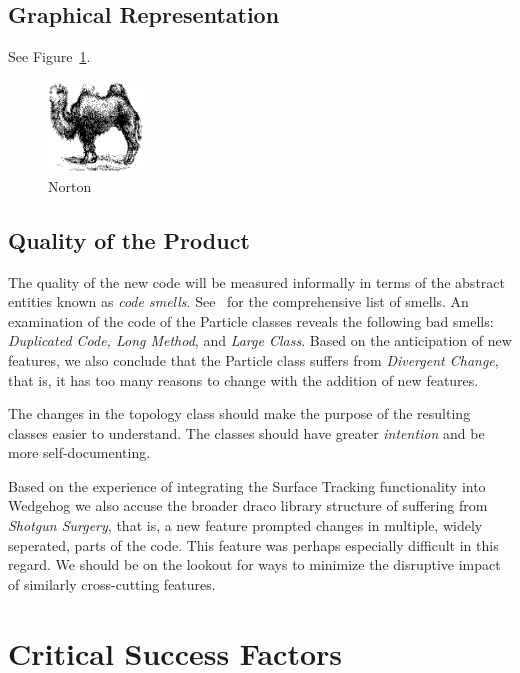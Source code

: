 \documentclass[11pt]{nmemo}
\begin{document}
\subsection*{Graphical Representation}

See Figure~\ref{fig:norton}.

\begin{figure}[h]
  \begin{center}
    \includegraphics[width=1in]{figures/camel.eps}
    \caption{Norton}
    \label{fig:norton}
  \end{center}
\end{figure}

\subsection*{Quality of the Product}

The quality of the new code will be measured informally in terms of
the abstract entities known as {\em code smells}. See~\cite[Chapter
3]{fowler00} for the comprehensive list of smells. An examination of
the code of the Particle classes reveals the following bad smells:
{\em Duplicated Code, Long Method}, and {\em Large Class}.  Based on
the anticipation of new features, we also conclude that the Particle
class suffers from {\em Divergent Change}, that is, it has too many
reasons to change with the addition of new features. 

The changes in the topology class should make the purpose of the
resulting classes easier to understand. The classes should have
greater {\em intention} and be more self-documenting.

Based on the experience of integrating the Surface Tracking
functionality into Wedgehog we also accuse the broader draco library
structure of suffering from {\em Shotgun Surgery}, that is, a new
feature prompted changes in multiple, widely seperated, parts of the
code. This feature was perhaps especially difficult in this regard. We
should be on the lookout for ways to minimize the disruptive impact of
similarly cross-cutting features.

\newpage
\section*{Critical Success Factors}
\end{document}
